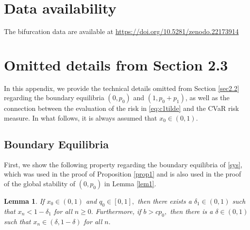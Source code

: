 \documentclass{article}
\theoremstyle{plain}
\newtheorem{lemma}{Lemma}
\theoremstyle{definition}
\begin{document}
\section*{Data availability}
The bifurcation data are available at \url{https://doi.org/10.5281/zenodo.22173914}

\appendix



\section{Omitted details from Section 2.3} \label{app}
In this appendix, we provide the technical details omitted from Section \ref{sec2.2} regarding the boundary equilibria $(0,p_0)$ and $(1,p_0+p_1)$, as well as the connection between the evaluation of the risk in \eqref{eq:c1tilde} and the CVaR risk measure. In what follows, it is always assumed that $x_0\in (0,1)$.

\subsection{Boundary Equilibria}\label{sec1_app}
First, we show the following property regarding the boundary equilibria of \eqref{sys}, which was used in the proof of Proposition \ref{prop1} and is also used in the proof of the global stability of $(0,p_0)$ in Lemma \ref{lem1}.
\begin{lemma} \label{lem_delta}
If $x_0\in(0,1)$ and $q_0\in[0,1],$ then there exists a $\delta_1\in(0,1)$ such that $x_n<1-\delta_1$ for all $n\geq 0.$ Furthermore, if $b>cp_0,$ then there is a $\delta\in(0,1)$ such that $x_n\in(\delta,1-\delta)$ for all $n.$
\end{lemma}
\end{document}
